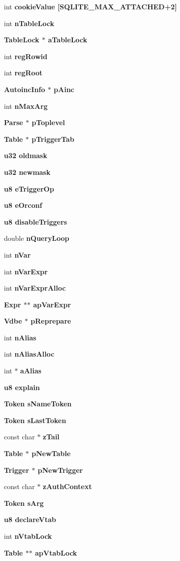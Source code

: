 \begin{CompactItemize}
int \bf{cookie\-Value} [SQLITE\_\-MAX\_\-ATTACHED+2]
\item 
int \bf{n\-Table\-Lock}
\item 
\bf{Table\-Lock} $\ast$ \bf{a\-Table\-Lock}
\item 
int \bf{reg\-Rowid}
\item 
int \bf{reg\-Root}
\item 
\bf{Autoinc\-Info} $\ast$ \bf{p\-Ainc}
\item 
int \bf{n\-Max\-Arg}
\item 
\bf{Parse} $\ast$ \bf{p\-Toplevel}
\item 
\bf{Table} $\ast$ \bf{p\-Trigger\-Tab}
\item 
\bf{u32} \bf{oldmask}
\item 
\bf{u32} \bf{newmask}
\item 
\bf{u8} \bf{e\-Trigger\-Op}
\item 
\bf{u8} \bf{e\-Orconf}
\item 
\bf{u8} \bf{disable\-Triggers}
\item 
double \bf{n\-Query\-Loop}
\item 
int \bf{n\-Var}
\item 
int \bf{n\-Var\-Expr}
\item 
int \bf{n\-Var\-Expr\-Alloc}
\item 
\bf{Expr} $\ast$$\ast$ \bf{ap\-Var\-Expr}
\item 
\bf{Vdbe} $\ast$ \bf{p\-Reprepare}
\item 
int \bf{n\-Alias}
\item 
int \bf{n\-Alias\-Alloc}
\item 
int $\ast$ \bf{a\-Alias}
\item 
\bf{u8} \bf{explain}
\item 
\bf{Token} \bf{s\-Name\-Token}
\item 
\bf{Token} \bf{s\-Last\-Token}
\item 
const char $\ast$ \bf{z\-Tail}
\item 
\bf{Table} $\ast$ \bf{p\-New\-Table}
\item 
\bf{Trigger} $\ast$ \bf{p\-New\-Trigger}
\item 
const char $\ast$ \bf{z\-Auth\-Context}
\item 
\bf{Token} \bf{s\-Arg}
\item 
\bf{u8} \bf{declare\-Vtab}
\item 
int \bf{n\-Vtab\-Lock}
\item 
\bf{Table} $\ast$$\ast$ \bf{ap\-Vtab\-Lock}
\item 

\end{CompactItemize}
